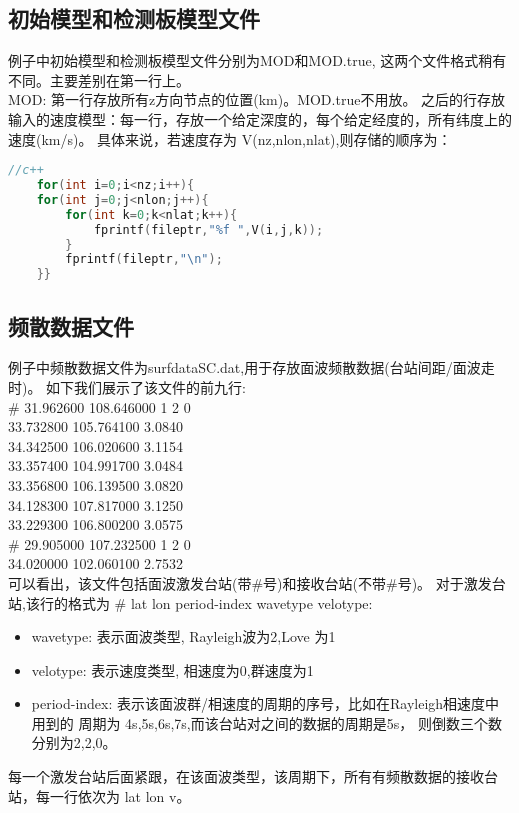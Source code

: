 \documentclass[10p,UTF8]{ctexart}
\begin{document}
   \subsection{初始模型和检测板模型文件}
   例子中初始模型和检测板模型文件分别为MOD和MOD.true, 这两个文件格式稍有不同。主要差别在第一行上。\\
   MOD: 第一行存放所有z方向节点的位置(km)。MOD.true不用放。
   之后的行存放输入的速度模型：每一行，存放一个给定深度的，每个给定经度的，所有纬度上的速度(km/s)。
   具体来说，若速度存为 V(nz,nlon,nlat),则存储的顺序为：
   \begin{lstlisting}[language=c++]
    //c++
    for(int i=0;i<nz;i++){
    for(int j=0;j<nlon;j++){
        for(int k=0;k<nlat;k++){
            fprintf(fileptr,"%f ",V(i,j,k));
        }
        fprintf(fileptr,"\n");
    }} 
 \end{lstlisting}


   \subsection{频散数据文件}
   例子中频散数据文件为surfdataSC.dat,用于存放面波频散数据(台站间距/面波走时)。 
   如下我们展示了该文件的前九行:\\
    \#  31.962600 108.646000 1 2 0\\
    33.732800 105.764100 3.0840\\
    34.342500 106.020600 3.1154\\
    33.357400 104.991700 3.0484\\
    33.356800 106.139500 3.0820\\
    34.128300 107.817000 3.1250\\
    33.229300 106.800200 3.0575\\
    \#  29.905000 107.232500 1 2 0\\
    34.020000 102.060100 2.7532\\

   可以看出，该文件包括面波激发台站(带\#号)和接收台站(不带\#号)。
   对于激发台站,该行的格式为 \# lat lon period-index wavetype velotype:
   \begin{itemize}
       \item wavetype: 表示面波类型, Rayleigh波为2,Love 为1
       \item velotype: 表示速度类型, 相速度为0,群速度为1
       \item period-index: 表示该面波群/相速度的周期的序号，比如在Rayleigh相速度中用到的
                            周期为 4s,5s,6s,7s,而该台站对之间的数据的周期是5s，
                            则倒数三个数分别为2,2,0。
   \end{itemize}
   每一个激发台站后面紧跟，在该面波类型，该周期下，所有有频散数据的接收台站，每一行依次为 lat lon v。
\end{document}
